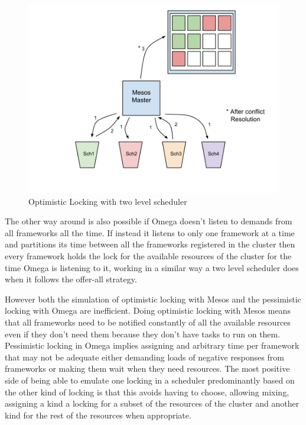\documentclass{svjour3}                     %
\begin{document}
\begin{figure}[!ht]
  \centering
  \includegraphics[scale=0.25,natwidth=960,natheight=720]{MesosOptimisticLocking.png}
  \caption{Optimistic Locking with two level scheduler}
  \label{fig:centralized}
\end{figure}

The other way around is also possible if Omega doesn't listen to
demands from all frameworks all the time. If instead it listens to only
one framework at a time and partitions its time between all the
frameworks registered in the cluster then every framework holds the
lock for the available resources of the cluster for the time Omega is
listening to it, working in a similar way a two level scheduler does
when it follows the offer-all strategy.

However both the simulation of optimistic locking with Mesos and the
pessimistic locking with Omega are inefficient. Doing optimistic
locking with Mesos means that all frameworks need to be notified
constantly of all the available resources even if they don't need them
because they don't have tasks to run on them. Pessimistic locking in
Omega implies assigning and arbitrary time per framework that may not
be adequate either demanding loads of negative responses from
frameworks or making them wait when they need resources. The most positive
side of being able to emulate one locking in a scheduler predominantly
based on the other kind of locking is that this avoids having to
choose, allowing mixing, assigning a kind a locking for a subset of
the resources of the cluster and another kind for the rest of the
resources when appropriate.
\end{document}
